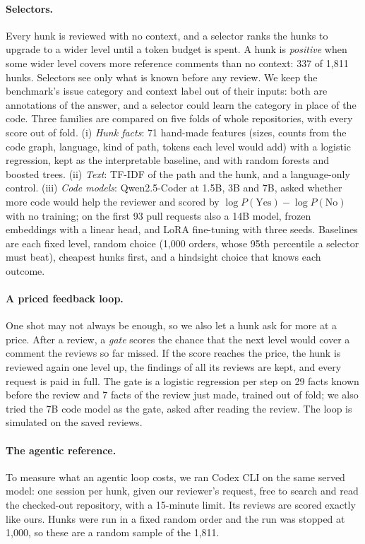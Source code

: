 \documentclass{article}
\begin{document}
\paragraph{Selectors.} Every hunk is reviewed with no context, and a selector ranks the hunks to upgrade to a wider level until a token budget is spent. A hunk is \emph{positive} when some wider level covers more reference comments than no context: 337 of 1,811 hunks. Selectors see only what is known before any review. We keep the benchmark's issue category and context label out of their inputs: both are annotations of the answer, and a selector could learn the category in place of the code. Three families are compared on five folds of whole repositories, with every score out of fold. (i) \emph{Hunk facts}: 71 hand-made features (sizes, counts from the code graph, language, kind of path, tokens each level would add) with a logistic regression, kept as the interpretable baseline, and with random forests and boosted trees. (ii) \emph{Text}: TF-IDF of the path and the hunk, and a language-only control. (iii) \emph{Code models}: Qwen2.5-Coder \citep{hui2024qwencoder} at 1.5B, 3B and 7B, asked whether more code would help the reviewer and scored by $\log P(\text{Yes})-\log P(\text{No})$ with no training; on the first 93 pull requests also a 14B model, frozen embeddings with a linear head, and LoRA fine-tuning \citep{hu2021lora} with three seeds. Baselines are each fixed level, random choice (1,000 orders, whose 95th percentile a selector must beat), cheapest hunks first, and a hindsight choice that knows each outcome.

\paragraph{A priced feedback loop.} One shot may not always be enough, so we also let a hunk ask for more at a price. After a review, a \emph{gate} scores the chance that the next level would cover a comment the reviews so far missed. If the score reaches the price, the hunk is reviewed again one level up, the findings of all its reviews are kept, and every request is paid in full. The gate is a logistic regression per step on 29 facts known before the review and 7 facts of the review just made, trained out of fold; we also tried the 7B code model as the gate, asked after reading the review. The loop is simulated on the saved reviews.

\paragraph{The agentic reference.} To measure what an agentic loop costs, we ran Codex CLI \citep{openai2026codex} on the same served model: one session per hunk, given our reviewer's request, free to search and read the checked-out repository, with a 15-minute limit. Its reviews are scored exactly like ours. Hunks were run in a fixed random order and the run was stopped at 1,000, so these are a random sample of the 1,811.
\end{document}
